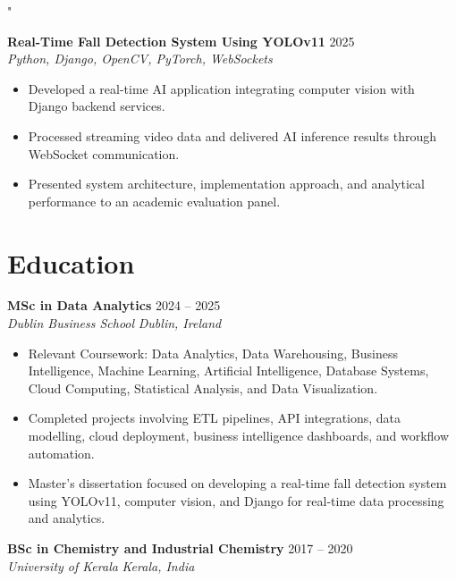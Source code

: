 "\documentclass[10pt,a4paper]{article}
\newcommand{\resumeSubheading}[4]{
\textbf{#1} \hfill #2 \\
\textit{#3} \hfill \textit{#4}
}
\begin{document}
\textbf{Real-Time Fall Detection System Using YOLOv11} \hfill 2025 \\
\textit{Python, Django, OpenCV, PyTorch, WebSockets}
\begin{itemize}
\item Developed a real-time AI application integrating computer vision with Django backend services.
\item Processed streaming video data and delivered AI inference results through WebSocket communication.
\item Presented system architecture, implementation approach, and analytical performance to an academic evaluation panel.
\end{itemize}
\section{Education}
\resumeSubheading
{MSc in Data Analytics}{2024 -- 2025}
{Dublin Business School}{Dublin, Ireland}
\begin{itemize}
\item Relevant Coursework: Data Analytics, Data Warehousing, Business Intelligence, Machine Learning, Artificial Intelligence, Database Systems, Cloud Computing, Statistical Analysis, and Data Visualization.
\item Completed projects involving ETL pipelines, API integrations, data modelling, cloud deployment, business intelligence dashboards, and workflow automation.
\item Master's dissertation focused on developing a real-time fall detection system using YOLOv11, computer vision, and Django for real-time data processing and analytics.
\end{itemize}
\vspace{3pt}
\resumeSubheading
{BSc in Chemistry and Industrial Chemistry}{2017 -- 2020}
{University of Kerala}{Kerala, India}
\end{document}
